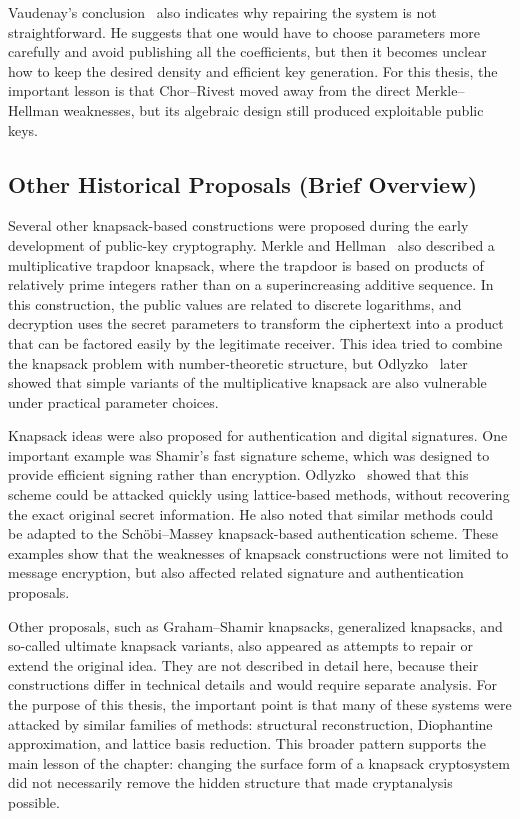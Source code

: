 Vaudenay's conclusion~\cite[p.~255]{Vaudenay1998} also indicates why repairing the system is not
straightforward. He suggests that one would have to choose parameters more
carefully and avoid publishing all the coefficients, but then it becomes unclear
how to keep the desired density and efficient key generation. For this thesis,
the important lesson is that Chor--Rivest moved away from the direct
Merkle--Hellman weaknesses, but its algebraic design still produced exploitable
public keys.


\subsection{Other Historical Proposals (Brief Overview)}

Several other knapsack-based constructions were proposed during the early
development of public-key cryptography. Merkle and Hellman~\cite[pp.~526--527]{MerkleHellman1978} also described a
multiplicative trapdoor knapsack, where the trapdoor is based on products of
relatively prime integers rather than on a superincreasing additive
sequence. In this construction, the
public values are related to discrete logarithms, and decryption uses the
secret parameters to transform the ciphertext into a product that can be
factored easily by the legitimate receiver. This idea tried to combine the
knapsack problem with number-theoretic structure, but
Odlyzko~\cite{Odlyzko1984Attacks} later showed that simple variants of the
multiplicative knapsack are also vulnerable under practical parameter choices.

Knapsack ideas were also proposed for authentication and digital signatures.
One important example was Shamir's fast signature scheme, which was designed to
provide efficient signing rather than encryption. Odlyzko~\cite{Odlyzko1984Attacks} showed that this
scheme could be attacked quickly using lattice-based methods, without
recovering the exact original secret information. He also noted that similar
methods could be adapted to the Sch\"obi--Massey knapsack-based authentication
scheme. These examples show that the weaknesses of knapsack constructions were
not limited to message encryption, but also affected related signature and
authentication proposals.

Other proposals, such as Graham--Shamir knapsacks, generalized knapsacks, and
so-called ultimate knapsack variants, also appeared as attempts to repair or
extend the original idea. They are not described in detail here, because their
constructions differ in technical details and would require separate analysis.
For the purpose of this thesis, the important point is that many of these
systems were attacked by similar families of methods: structural
reconstruction, Diophantine approximation, and lattice basis reduction. This
broader pattern supports the main lesson of the chapter: changing the surface
form of a knapsack cryptosystem did not necessarily remove the hidden structure
that made cryptanalysis possible.~\cite{Brickell1984,OdlyzkoRiseFall}

